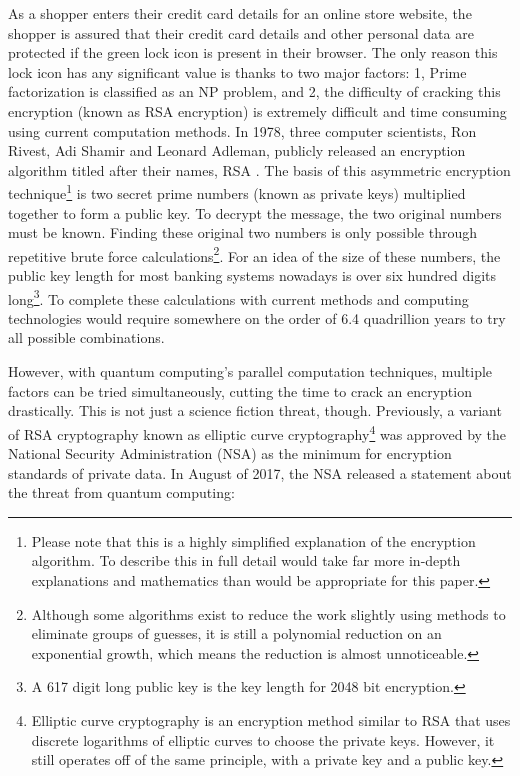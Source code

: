 \documentclass[10pt,journal,compsoc]{IEEEtran}
\begin{document}
As a shopper enters their credit card details for an online store website, the shopper is assured that their credit card details and other personal data are protected if the green lock icon is present in their browser. The only reason this lock icon has any significant value is thanks to two major factors: 1, Prime factorization is classified as an NP problem, and 2, the difficulty of cracking this encryption (known as RSA encryption) is extremely difficult and time consuming using current computation methods. In 1978, three computer scientists, Ron Rivest, Adi Shamir and Leonard Adleman, publicly released an encryption algorithm titled after their names, RSA \cite{RSA}. The basis of this asymmetric encryption technique\footnote{Please note that this is a highly simplified explanation of the encryption algorithm. To describe this in full detail would take far more in-depth explanations and mathematics than would be appropriate for this paper.} is two secret prime numbers (known as private keys) multiplied together to form a public key. To decrypt the message, the two original numbers must be known. Finding these original two numbers is only possible through repetitive brute force calculations\footnote{Although  some algorithms exist to reduce the work slightly using methods to eliminate groups of guesses, it is still a polynomial reduction on an exponential growth, which means the reduction is almost unnoticeable.}. For an idea of the size of these numbers, the public key length for most banking systems nowadays is over six hundred digits long\footnote{A 617 digit long public key is the key length for 2048 bit encryption.}\cite{Numberphile}. To complete these calculations with current  methods and computing technologies  would require somewhere on the order of 6.4 quadrillion years to try all possible combinations. 

However, with quantum computing's parallel computation techniques, multiple factors can be tried simultaneously, cutting the time to crack an encryption drastically. This is not just a science fiction threat, though. Previously, a variant of RSA cryptography known as elliptic curve cryptography\footnote{Elliptic curve cryptography is an encryption method similar to RSA that uses discrete logarithms of elliptic curves to choose the private keys. However, it still operates off of the same principle, with a private key and a public key.} was approved by the National Security Administration (NSA) as the minimum for encryption standards of private data. In August of 2017, the NSA released a statement about the threat from quantum computing:
\end{document}
